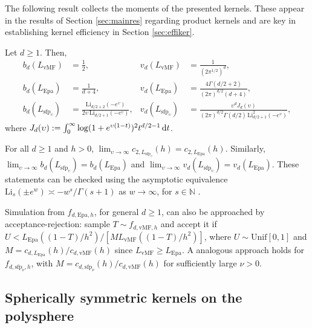 \documentclass[oneside,11pt]{article}
\begin{document}
The following result collects the moments of the presented kernels. These appear in the results of Section \ref{sec:mainres} regarding product kernels and are key in establishing kernel efficiency in Section \ref{sec:effiker}.

\begin{proposition}\label{prop:moments}
Let $d\geq1$. Then,
\begin{align*}
    b_d(L_{\mathrm{vMF}})&=\frac{1}{2},&
    v_d(L_{\mathrm{vMF}})&=\frac{1}{(2\pi^{1/2})^d},\\
    b_d(L_{\mathrm{Epa}})&=\frac{1}{d+4},&
    v_d(L_{\mathrm{Epa}})&=\frac{4\Gamma(d/2+2)}{(2\pi)^{d/2}(d+4)},\\
    b_d(L_{\mathrm{sfp}_\upsilon})&=\frac{\mathrm{Li}_{d/2+2}(-e^\upsilon)}{2\upsilon\,\mathrm{Li}_{d/2+1}(-e^\upsilon)},&
    v_d(L_{\mathrm{sfp}_\upsilon})&=\frac{\upsilon^d J_d(\upsilon)}{(2\pi)^{d/2}\Gamma(d/2) \,\mathrm{Li}^2_{d/2+1}(-e^\upsilon)},
\end{align*}
where $J_d(\upsilon):=\int_0^\infty \log(1+e^{\upsilon(1-t)})^2 t^{d/2-1} \,\mathrm{d} t$.
\end{proposition}

\begin{remark}\label{rem:equiv}
    For all $d\geq 1$ and $h>0$, $\lim_{\upsilon\to\infty}c_{2,L_{\mathrm{sfp}_\upsilon}}(h)=c_{2,L_\mathrm{Epa}}(h)$. Similarly, $\lim_{\upsilon\to\infty}b_d(L_{\mathrm{sfp}_\upsilon})=b_d(L_\mathrm{Epa})$ and $\lim_{\upsilon\to\infty}v_d(L_{\mathrm{sfp}_\upsilon})=v_d(L_\mathrm{Epa})$. These statements can be checked using the asymptotic equivalence $\mathrm{Li}_{s}\left(\pm e^w\right) \asymp-w^s/\Gamma(s+1)$ as $w\to\infty$, for $s\in\mathbb{N}$ \cite[Equation (11.3)]{Wood1992}.
\end{remark}

Simulation from $f_{d,\mathrm{Epa},h}$, for general $d\geq1$, can also be approached by acceptance-rejection: sample $T\sim f_{d,\mathrm{vMF},h}$ and accept it if $U<L_{\mathrm{Epa}}((1-T)/h^2)/[M L_{\mathrm{vMF}}((1-T)/h^2)]$, where $U\sim\mathrm{Unif}[0,1]$ and $M=c_{d,L_\mathrm{Epa}}(h)/c_{d,\mathrm{vMF}}(h)$ since $L_{\mathrm{vMF}}\geq L_{\mathrm{Epa}}$. A analogous approach holds for $f_{d,\mathrm{sfp}_\nu,h}$, with $M=c_{d,\mathrm{sfp}_\nu}(h)/c_{d,\mathrm{vMF}}(h)$ for sufficiently large $\nu>0$.

\subsection{Spherically symmetric kernels on the polysphere}
\label{sec:sphker}
\end{document}
